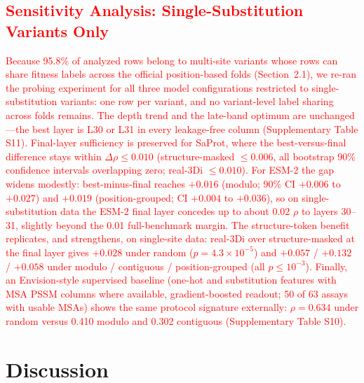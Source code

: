 \documentclass[numbered,webpdf,modern,large]{oup-authoring-template}
\newcommand{\rev}[1]{\textcolor{red}{#1}}
\begin{document}
\subsection{\rev{Sensitivity Analysis: Single-Substitution Variants Only}}
\label{sec:single_site}

\rev{Because 95.8\% of analyzed rows belong to multi-site variants whose
rows can share fitness labels across the official position-based folds
(Section~2.1), we re-ran the probing experiment for all three model
configurations restricted to single-substitution variants: one row per
variant, and no variant-level label sharing across folds remains. The
depth trend and the late-band optimum are unchanged---the best layer is
L30 or L31 in every leakage-free column (Supplementary Table S11).
Final-layer sufficiency is preserved for SaProt, where the
best-versus-final difference stays within $\Delta\rho \leq 0.010$
(structure-masked $\leq 0.006$, all bootstrap 90\% confidence intervals
overlapping zero; real-3Di $\leq 0.010$). For ESM-2 the gap widens
modestly: best-minus-final reaches $+0.016$ (modulo; 90\% CI $+0.006$ to
$+0.027$) and $+0.019$ (position-grouped; CI $+0.004$ to $+0.036$), so
on single-substitution data the ESM-2 final layer concedes up to about
$0.02$ $\rho$ to layers 30--31, slightly beyond the 0.01 full-benchmark
margin. The structure-token benefit replicates, and strengthens, on
single-site data: real-3Di over structure-masked at the final layer
gives $+0.028$ under random ($p = 4.3 \times 10^{-5}$) and $+0.057$ /
$+0.132$ / $+0.058$ under modulo / contiguous / position-grouped (all
$p \leq 10^{-3}$). Finally, an Envision-style supervised baseline
(one-hot and substitution features with MSA PSSM columns where
available, gradient-boosted readout; 50 of 63 assays with usable MSAs)
shows the same protocol signature externally: $\rho = 0.634$ under
random versus 0.410 modulo and 0.302 contiguous
(Supplementary Table S10).}

\section{Discussion}
\end{document}

